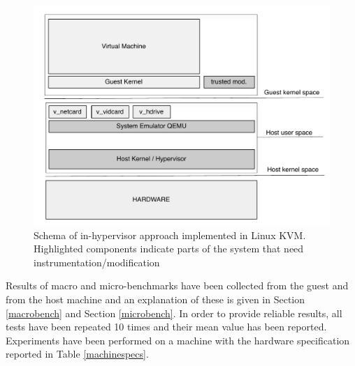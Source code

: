\begin{figure}
\begin{center}
\includegraphics[scale=0.5]{images/hellorootkitty_schema.pdf}
\caption{Schema of in-hypervisor approach implemented in Linux KVM. Highlighted components indicate parts of the system that need instrumentation/modification}
\label{hellorootkitty_schema}
\end{center}
\end{figure}


Results of macro and micro-benchmarks have been collected from the guest and from the host machine and an explanation of these is given in Section \ref{macrobench} and Section \ref{microbench}.
In order to provide reliable results, all tests have been repeated 10 times and their mean value has been reported. Experiments have been performed on a machine with the hardware specification reported in Table \ref{machinespecs}.

%

